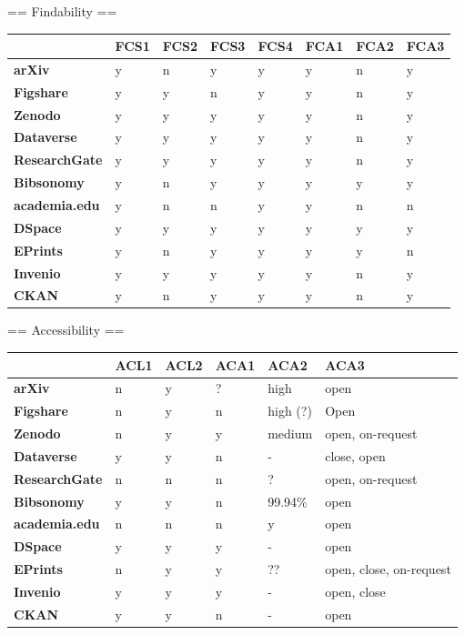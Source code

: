== Findability  ==

\begin{tabular}{|m{2.1cm}|m{0.8cm}|m{0.8cm}|m{0.8cm}|m{0.8cm}|m{0.8cm}|m{0.8cm}|m{0.8cm}|} \hline 
 & \textbf{FCS1}  & \textbf{FCS2}  & \textbf{FCS3}  & \textbf{FCS4}  & \textbf{FCA1}  & \textbf{FCA2}  & \textbf{FCA3}  \\ \hline 
\textbf{arXiv}  &y &n &y &y &y &n &y \\ \hline 
\textbf{Figshare}  &y &y &n &y &y &n &y \\ \hline 
\textbf{Zenodo}  &y &y &y &y &y &n &y \\ \hline 
\textbf{Dataverse}  &y &y &y &y &y &n &y \\ \hline 
\textbf{ResearchGate}  &y &y &y &y &y &n &y \\ \hline 
\textbf{Bibsonomy}  &y &n &y &y &y &y &y \\ \hline 
\textbf{academia.edu}  &y &n &n &y &y &n &n \\ \hline 
 \hline 
\textbf{DSpace}  &y &y &y &y &y &y &y \\ \hline 
\textbf{EPrints}  &y &n &y &y &y &y &n \\ \hline 
\textbf{Invenio}  &y &y &y &y &y &n &y \\ \hline 
\textbf{CKAN}  &y &n &y &y &y &n &y \\ \hline 
 \end{tabular}


== Accessibility ==

\begin{tabular}{|m{2.1cm}|m{0.8cm}|m{0.8cm}|m{0.8cm}|m{0.8cm}|m{0.8cm}|} \hline 
 & \textbf{ACL1}  & \textbf{ACL2}  & \textbf{ACA1}  & \textbf{ACA2}  & \textbf{ACA3}  \\ \hline 
\textbf{arXiv}  &n &y &? &high &open \\ \hline 
\textbf{Figshare}  &n &y &n &high (?) &Open \\ \hline 
\textbf{Zenodo}  &n &y &y &medium &open, on-request \\ \hline 
\textbf{Dataverse}  &y &y &n &- &close, open \\ \hline 
\textbf{ResearchGate}  &n &n &n &? &open, on-request \\ \hline 
\textbf{Bibsonomy}  &y &y &n &99.94\% &open \\ \hline 
\textbf{academia.edu}  &n &n &n &y &open \\ \hline 
 \hline 
\textbf{DSpace}  &y &y &y &- &open \\ \hline 
\textbf{EPrints}  &n &y &y &?? &open, close, on-request \\ \hline 
\textbf{Invenio}  &y &y &y &- &open, close \\ \hline 
\textbf{CKAN}  &y &y &n &- &open \\ \hline 
 \end{tabular}



